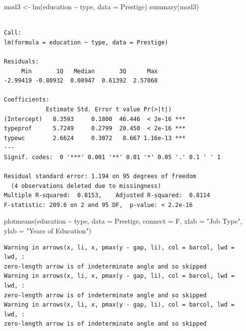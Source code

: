 \documentclass[
  letterpaper,
  DIV=11,
  numbers=noendperiod,
  oneside]{scrreprt}
\newenvironment{Shaded}{\begin{snugshade}}{\end{snugshade}}
\newcommand{\AttributeTok}[1]{\textcolor[rgb]{0.40,0.45,0.13}{#1}}
\newcommand{\FunctionTok}[1]{\textcolor[rgb]{0.28,0.35,0.67}{#1}}
\newcommand{\NormalTok}[1]{\textcolor[rgb]{0.00,0.23,0.31}{#1}}
\newcommand{\OtherTok}[1]{\textcolor[rgb]{0.00,0.23,0.31}{#1}}
\newcommand{\SpecialCharTok}[1]{\textcolor[rgb]{0.37,0.37,0.37}{#1}}
\newcommand{\StringTok}[1]{\textcolor[rgb]{0.13,0.47,0.30}{#1}}
\begin{document}
\begin{Shaded}
\begin{Highlighting}[]
\NormalTok{mod3 }\OtherTok{\textless{}{-}} \FunctionTok{lm}\NormalTok{(education }\SpecialCharTok{\textasciitilde{}}\NormalTok{ type, }\AttributeTok{data =}\NormalTok{ Prestige)}
\FunctionTok{summary}\NormalTok{(mod3)}
\end{Highlighting}
\end{Shaded}

\begin{verbatim}

Call:
lm(formula = education ~ type, data = Prestige)

Residuals:
     Min       1Q   Median       3Q      Max 
-2.99419 -0.80932  0.08947  0.61392  2.57068 

Coefficients:
            Estimate Std. Error t value Pr(>|t|)    
(Intercept)   8.3593     0.1800  46.446  < 2e-16 ***
typeprof      5.7249     0.2799  20.450  < 2e-16 ***
typewc        2.6624     0.3072   8.667 1.16e-13 ***
---
Signif. codes:  0 '***' 0.001 '**' 0.01 '*' 0.05 '.' 0.1 ' ' 1

Residual standard error: 1.194 on 95 degrees of freedom
  (4 observations deleted due to missingness)
Multiple R-squared:  0.8153,    Adjusted R-squared:  0.8114 
F-statistic: 209.6 on 2 and 95 DF,  p-value: < 2.2e-16
\end{verbatim}

\begin{Shaded}
\begin{Highlighting}[]
\FunctionTok{plotmeans}\NormalTok{(education }\SpecialCharTok{\textasciitilde{}}\NormalTok{ type, }\AttributeTok{data =}\NormalTok{ Prestige, }\AttributeTok{connect =}\NormalTok{ F, }\AttributeTok{xlab =} \StringTok{"Job Type"}\NormalTok{, }\AttributeTok{ylab =} \StringTok{"Years of Education"}\NormalTok{)}
\end{Highlighting}
\end{Shaded}

\begin{verbatim}
Warning in arrows(x, li, x, pmax(y - gap, li), col = barcol, lwd = lwd, :
zero-length arrow is of indeterminate angle and so skipped
Warning in arrows(x, li, x, pmax(y - gap, li), col = barcol, lwd = lwd, :
zero-length arrow is of indeterminate angle and so skipped
Warning in arrows(x, li, x, pmax(y - gap, li), col = barcol, lwd = lwd, :
zero-length arrow is of indeterminate angle and so skipped
\end{verbatim}
\end{document}
